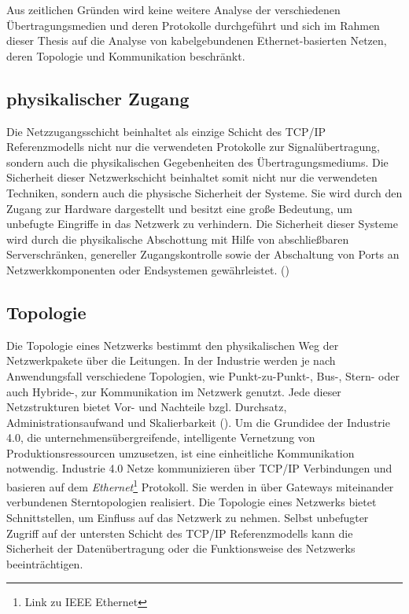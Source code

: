 Aus zeitlichen Gründen wird keine weitere Analyse der verschiedenen Übertragungsmedien und deren Protokolle durchgeführt und sich im Rahmen dieser Thesis auf die Analyse von kabelgebundenen Ethernet-basierten Netzen, deren Topologie und Kommunikation beschränkt.

\subsection{physikalischer Zugang}
Die Netzzugangsschicht beinhaltet als einzige Schicht des \ac{TCP}/\ac{IP} Referenzmodells nicht nur die verwendeten Protokolle zur Signalübertragung, sondern auch die physikalischen Gegebenheiten des Übertragungsmediums. Die Sicherheit dieser Netzwerkschicht beinhaltet somit nicht nur die verwendeten Techniken, sondern auch die physische Sicherheit der Systeme. Sie wird durch den Zugang zur Hardware dargestellt und besitzt eine große Bedeutung, um unbefugte Eingriffe in das Netzwerk zu verhindern. Die Sicherheit dieser Systeme wird durch die physikalische Abschottung mit Hilfe von abschließbaren Serverschränken, genereller Zugangskontrolle sowie der Abschaltung von Ports an Netzwerkkomponenten oder Endsystemen gewährleistet. (\cite{sichKom2017})

\subsection{Topologie}
Die Topologie eines Netzwerks bestimmt den physikalischen Weg der Netzwerkpakete über die Leitungen. In der Industrie werden je nach Anwendungsfall verschiedene Topologien, wie Punkt-zu-Punkt-, Bus-, Stern- oder auch Hybride-, zur Kommunikation im Netzwerk genutzt. Jede dieser Netzstrukturen bietet Vor- und Nachteile bzgl. Durchsatz, Administrationsaufwand und Skalierbarkeit (\cite{burke2013}). Um die Grundidee der Industrie 4.0, die unternehmensübergreifende, intelligente Vernetzung von Produktionsressourcen umzusetzen, ist eine einheitliche Kommunikation notwendig. Industrie 4.0 Netze kommunizieren über \ac{TCP}/\ac{IP} Verbindungen und basieren auf dem \textit{Ethernet}\footnote{Link zu IEEE Ethernet} Protokoll. Sie werden in über Gateways miteinander verbundenen Sterntopologien realisiert. Die Topologie eines Netzwerks bietet Schnittstellen, um Einfluss auf das Netzwerk zu nehmen. Selbst unbefugter Zugriff auf der untersten Schicht des \ac{TCP}/\ac{IP} Referenzmodells kann die Sicherheit der Datenübertragung oder die Funktionsweise des Netzwerks beeinträchtigen.

